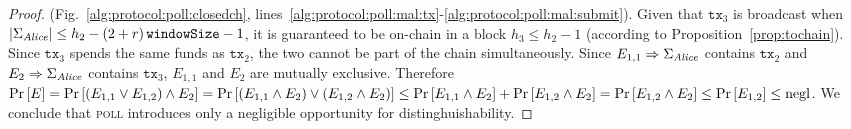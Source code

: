 \begin{proof}
  (Fig.~\ref{alg:protocol:poll:closedch},
  lines~\ref{alg:protocol:poll:mal:tx}-\ref{alg:protocol:poll:mal:submit}).
  Given that $\mathtt{tx}_3$ is broadcast when $|\Sigma_{\mathit{Alice}}| \leq h_2 -
  \left(2 + r\right)\texttt{windowSize}{} - 1$, it is guaranteed to be on-chain in a block $h_3 \leq h_2 - 1$
  (according to Proposition~\ref{prop:tochain}). Since $\mathtt{tx}_3$ spends
  the same funds as $\mathtt{tx}_2$, the two cannot be part of the chain
  simultaneously. Since $E_{1,1} \Rightarrow \Sigma_{\mathit{Alice}}$ contains
  $\mathtt{tx}_2$ and $E_2 \Rightarrow \Sigma_{\mathit{Alice}}$ contains
  $\mathtt{tx}_3$, $E_{1,1}$ and $E_2$ are mutually exclusive. Therefore
  $\Pr\left[E\right] = \Pr\left[\left(E_{1,1} \vee E_{1,2}\right) \wedge
  E_2\right] = \Pr\left[\left(E_{1,1} \wedge E_2\right) \vee \left(E_{1,2}
  \wedge E_2\right)\right] \leq \Pr\left[E_{1,1} \wedge E_2\right] +
  \Pr\left[E_{1,2} \wedge E_2\right] = \Pr\left[E_{1,2} \wedge E_2\right] \leq
  \Pr\left[E_{1,2}\right] \leq \text{negl}$. We conclude that \textsc{poll} introduces
  only a negligible opportunity for distinghuishability.

\end{proof}
